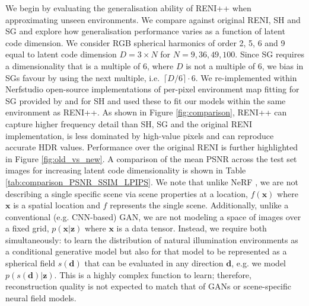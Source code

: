 We begin by evaluating the generalisation ability of RENI++ when approximating unseen environments. We compare against original RENI, SH and SG and explore how generalisation performance varies as a function of latent code dimension. We consider RGB spherical harmonics of order 2, 5, 6 and 9 equal to latent code dimension $D = 3 \times N$ for $N=9, 36, 49, 100$. Since SG requires a dimensionality that is a multiple of 6, where $D$ is not a multiple of 6, we bias in SGs favour by using the next multiple, i.e.~$\lceil D/6 \rceil \cdot 6$. We re-implemented within Nerfstudio open-source implementations of per-pixel environment map fitting for SG provided by \cite{li_inverse_2020} and \cite{charlmersgitSphericalHarmonics2022} for SH and used these to fit our models within the same environment as RENI++. As shown in Figure \ref{fig:comparison}, RENI++ can capture higher frequency detail than SH, SG and the original RENI implementation, is less dominated by high-value pixels and can reproduce accurate HDR values. Performance over the original RENI is further highlighted in Figure \ref{fig:old_vs_new}. A comparison of the mean PSNR across the test set images for increasing latent code dimensionality is shown in Table \ref{tab:comparison_PSNR_SSIM_LPIPS}. We note that unlike NeRF \cite{mildenhall_nerf_2020}, we are not describing a single specific scene via scene properties at a location, $f(\mathbf{x})$ where $\mathbf{x}$ is a spatial location and $f$ represents the single scene. Additionally, unlike a conventional (e.g. CNN-based) GAN, we are not modeling a space of images over a fixed grid, $p(\mathbf{x}|\mathbf{z})$ where $\mathbf{x}$ is a data tensor. Instead, we require both simultaneously: to learn the distribution of natural illumination environments as a conditional generative model but also for that model to be represented as a spherical field $s(\mathbf{d})$ that can be evaluated in any direction $\mathbf{d}$, e.g. we model $p(s(\mathbf{d})|\mathbf{z})$. This is a highly complex function to learn; therefore, reconstruction quality is not expected to match that of GANs or scene-specific neural field models.

